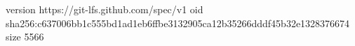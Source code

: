 version https://git-lfs.github.com/spec/v1
oid sha256:c637006bb1c555bd1ad1eb6ffbe3132905ca12b35266dddf45b32e1328376674
size 5566
